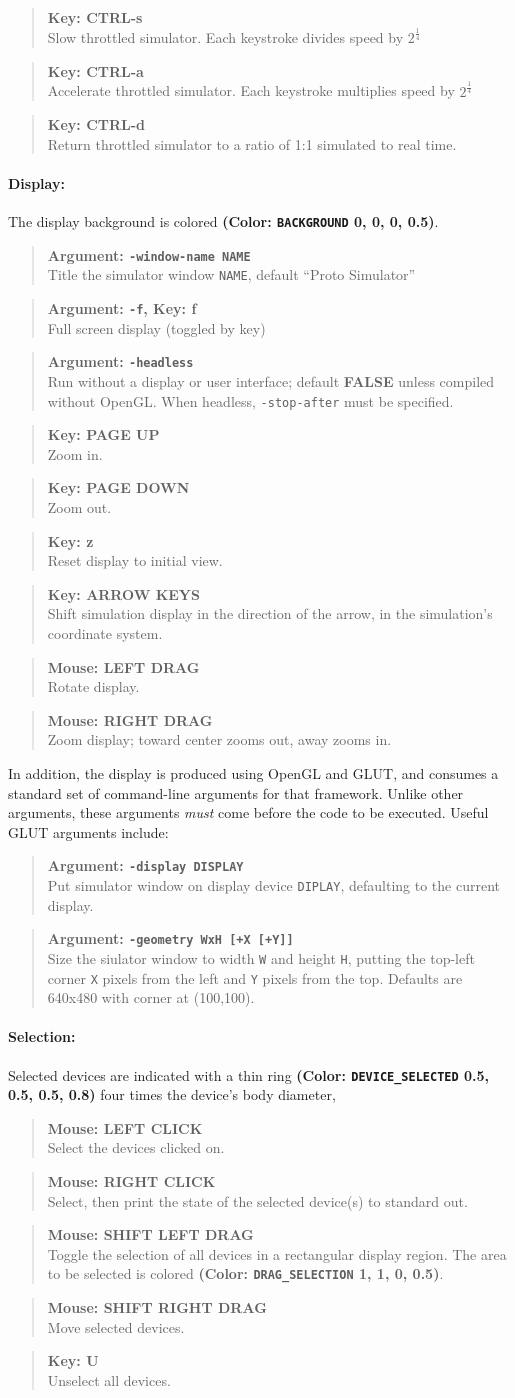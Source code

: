 \documentclass{article}
\newcommand\todo[1]{\immediate\write16{TODO: #1}}
\newcommand\false{{\bf FALSE}}
\newcommand\var[1]{{\tt #1}}
\newcommand\key[1]{{\bf #1}}
\newcommand\simarg[2]{\begin{quote} {\bf Argument: \var{#1}} \\ #2 \end{quote}}
\newcommand\simkey[2]{\begin{quote} {\bf Key: \key{#1}} \\ #2 \end{quote}}
\newcommand\simmouse[2]{\begin{quote} {\bf Mouse: \key{#1}} \\ #2 \end{quote}}
\newcommand\simargkey[3]{
  \begin{quote} {\bf Argument: \var{#1}, Key: \key{#2}} \\ #3 \end{quote}
}
\newcommand\color[5]{{\bf (Color: {\tt #1} #2, #3, #4, #5)}} %
\begin{document}
\simkey{CTRL-s}{Slow throttled simulator.  Each keystroke
    divides speed by $2^{\frac{1}{4}}$}
\simkey{CTRL-a}{Accelerate throttled simulator.  Each keystroke
  multiplies speed by $2^{\frac{1}{4}}$}
\simkey{CTRL-d}{Return throttled simulator to a ratio of 1:1 simulated to real 
  time.}

\paragraph{Display:}
The display background is colored \color{BACKGROUND}{0}{0}{0}{0.5}.

\simarg{-window-name NAME}{Title the simulator window \var{NAME}, 
  default ``Proto Simulator''}
\simargkey{-f}{f}{Full screen display (toggled by key)}
\todo{Need to add GLUT geometry arguments}
\simarg{-headless}{Run without a display or user interface;
  default \false{} unless compiled without OpenGL.  When headless,
  \var{-stop-after} must be specified.}

\simkey{PAGE UP}{Zoom in.}
\simkey{PAGE DOWN}{Zoom out.}
\simkey{z}{Reset display to initial view.}
\simkey{ARROW KEYS}{Shift simulation display in the direction of the arrow, 
  in the simulation's coordinate system.}
\simmouse{LEFT DRAG}{Rotate display.}
\simmouse{RIGHT DRAG}{Zoom display; toward center zooms out, away zooms in.}

In addition, the display is produced using OpenGL and GLUT, and
consumes a standard set of command-line arguments for that framework.
Unlike other arguments, these arguments {\em must} come before the
code to be executed.  Useful GLUT arguments include:
\simarg{-display DISPLAY}{Put simulator window on display device
  \var{DIPLAY}, defaulting to the current display.}
\simarg{-geometry WxH [+X [+Y]]}{Size the siulator window to width
  \var{W} and height \var{H}, putting the top-left corner \var{X}
  pixels from the left and \var{Y} pixels from the top.  Defaults are
  640x480 with corner at (100,100).}

  
\paragraph{Selection:}
Selected devices are indicated with a thin ring
\color{DEVICE\_SELECTED}{0.5}{0.5}{0.5}{0.8} four times the device's
body diameter,

\simmouse{LEFT CLICK}{Select the devices clicked on.}
\simmouse{RIGHT CLICK}{Select, then print the state of the selected
  device(s) to standard out.}
\simmouse{SHIFT LEFT DRAG}{Toggle the selection of all devices in a
  rectangular display region.  The area to be selected is colored
  \color{DRAG\_SELECTION}{1}{1}{0}{0.5}.}
\simmouse{SHIFT RIGHT DRAG}{Move selected devices.}
\simkey{U}{Unselect all devices.}
\end{document}
